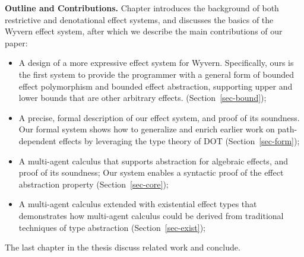 \noindent\textbf{Outline and Contributions.}  
Chapter introduces the background of both restrictive and denotational effect systems, and discusses the basics of the Wyvern effect system, after which we describe the main contributions of our paper:
\begin{itemize}
\item A design of a more expressive effect system for Wyvern. Specifically, ours is the first system to provide the programmer with a general form of bounded effect polymorphism and bounded effect abstraction, supporting upper and lower bounds that are other arbitrary effects.  (Section~\ref{sec-bound});
\item A precise, formal description of our effect system, and proof of its soundness.  Our formal system shows how to generalize and enrich earlier work on path-dependent effects by leveraging the type theory of DOT (Section~\ref{sec-form});
\item A multi-agent calculus  that supports abstraction for algebraic effects, and proof of its soundness;  Our system enables a syntactic proof of the effect abstraction property (Section~\ref{sec-core});
\item A multi-agent calculus extended with existential effect types that demonstrates how multi-agent calculus could be derived from traditional techniques of type abstraction (Section~\ref{sec-exist});
\end{itemize}
The last chapter in the thesis discuss related work and conclude.
